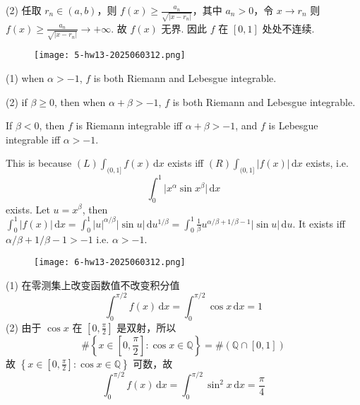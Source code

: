 (2)
任取 $r_n\in(a,b)$，则 $f(x)\geq\frac{a_n}{\sqrt{ \lvert x-r_n \rvert }}$，其中 $a_n>0$，令 $x\to r_n$ 则 $f(x)\geq\frac{a_n}{\sqrt{ \lvert x-r_n \rvert }}\to +\infty$. 故 $f(x)$ 无界. 因此 $f$ 在 $[0,1]$ 处处不连续.

\begin{exercise}
\begin{figure}[H]
\centering
\texttt{[image: 5-hw13-2025060312.png]}
\label{}
\end{figure}
\end{exercise}
(1) when $\alpha>-1$, $f$ is both Riemann and Lebesgue integrable.

(2) if $\beta\geq0$, then when $\alpha+\beta>-1$, $f$ is both Riemann and Lebesgue integrable.

If $\beta<0$, then $f$ is Riemann integrable iff $\alpha+\beta>-1$, and $f$ is Lebesgue integrable iff $\alpha>-1$.

This is because $(L)\int_{(0,1]}^{} f(x) \, \mathrm{d}x$ exists iff $(R)\int_{(0,1]}^{} \lvert f(x) \rvert \, \mathrm{d}x$ exists, i.e.
\[
\int_{0}^{1} \lvert x^{\alpha}\sin x^{\beta} \rvert  \, \mathrm{d}x
\]
exists. Let $u=x^{\beta}$, then $\int_{0}^{1} \lvert f(x) \rvert \, \mathrm{d}x=\int_{0}^{1} \lvert u \rvert ^{\alpha/\beta }\lvert \sin u \rvert \, \mathrm{d}u^{1/\beta }=\int_{0}^{1} \frac{1}{\beta}u^{\alpha/\beta+1/\beta-1}\lvert \sin u \rvert \, \mathrm{d}u$. It exists iff $\alpha/\beta+1/\beta-1>-1$ i.e. $\alpha>-1$.

\begin{exercise}
\begin{figure}[H]
\centering
\texttt{[image: 6-hw13-2025060312.png]}
\label{}
\end{figure}
\end{exercise}
(1)
在零测集上改变函数值不改变积分值
\[
\int_{0}^{\pi/2 } f(x) \, \mathrm{d}x =\int_{0}^{\pi/2 } \cos x \, \mathrm{d}x =1
\]
(2)
由于 $\cos x$ 在 $\left[ 0,\frac{\pi}{2} \right]$ 是双射，所以
\[
\#\left\{  x\in\left[ 0,\frac{\pi}{2} \right]:\cos x\in \mathbb{Q}  \right\}=\#(\mathbb{Q}\cap[0,1])
\]
故 $\left\{  x\in\left[ 0,\frac{\pi}{2} \right]:\cos x\in \mathbb{Q}  \right\}$ 可数，故
\[
\int_{0}^{\pi/2 } f(x) \, \mathrm{d}x=\int_{0}^{\pi/2 } \sin ^2x \, \mathrm{d}x =\frac{\pi}{4}
\]